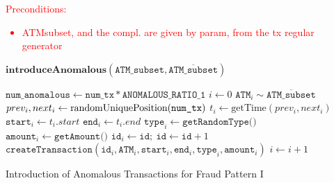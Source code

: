 \documentclass{article}
\begin{document}
\textcolor{red}{Preconditions:
\begin{itemize}
  \item ATMsubset, and the compl. are given by param, from the tx regular generator
\end{itemize}
}

\begin{algorithm}[H]
  \small
  $\textbf{introduceAnomalous}(\texttt{ATM\_subset}, \overline{\texttt{ATM\_subset}})$
  \begin{algorithmic}[1]
  \STATE $\texttt{num\_anomalous} \gets \texttt{num\_tx} * \texttt{ANOMALOUS\_RATIO\_1}$
  \STATE $i \gets 0$
      \STATE $\texttt{ATM}_{i} \sim \overline{\texttt{ATM\_subset}}$
      \STATE $prev_i, next_i \gets \text{randomUniquePosition(\texttt{num\_tx})}$
      \STATE $t_i \gets \text{getTime}(prev_i, next_i)$
      \STATE $\texttt{start}_{i} \gets t_i.start$
      \STATE $\texttt{end}_{i} \gets t_i.end$
      \STATE $\texttt{type}_{i} \gets \texttt{getRandomType()}$
      \STATE $\texttt{amount}_{i} \gets \texttt{getAmount()}$
      \STATE $\texttt{id}_{i} \gets \texttt{id}; \ \texttt{id} \gets \texttt{id} + 1$
      \STATE $\texttt{createTransaction}(\texttt{id}_{i}, \texttt{ATM}_i, \texttt{start}_{i},\texttt{end}_{i}, \texttt{type}_{i}, \texttt{amount}_i)$
      \STATE $i \gets i + 1$
  \ENDWHILE
  \end{algorithmic}
  \caption{Introduction of Anomalous Transactions for Fraud Pattern I}
  \label{alg:anomalous-tx-generator-1}
\end{algorithm}
\end{document}
